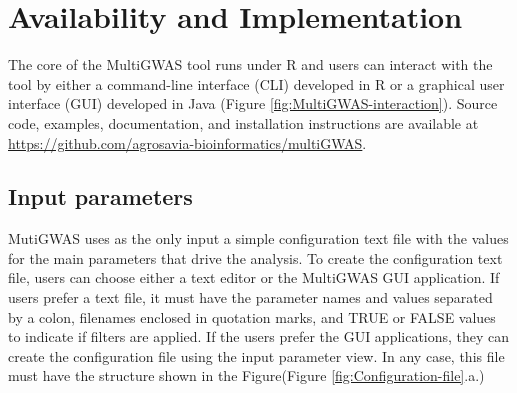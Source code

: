 \documentclass{article}
\begin{document}
\section{Availability and Implementation}

The core of the MultiGWAS tool runs under R and users can interact with the tool by either a command-line interface (CLI) developed in
R or a graphical user interface (GUI) developed in Java (Figure \ref{fig:MultiGWAS-interaction}).
Source code, examples, documentation, and installation instructions are available at \url{https://github.com/agrosavia-bioinformatics/multiGWAS}. 


\subsection{Input parameters}

MutiGWAS uses as the only input a simple configuration text file with the values for the main parameters that drive the analysis. To create the configuration text file, users can choose either a text editor or the MultiGWAS GUI application.  If users prefer a text file, it must have the parameter names and values separated by a colon, filenames enclosed in quotation marks, and TRUE or FALSE values to indicate if filters are applied. If the users prefer the GUI applications, they can create the configuration file using the input parameter view. In any case, this file must have the structure shown in the Figure(Figure \ref{fig:Configuration-file}.a.)
\end{document}
